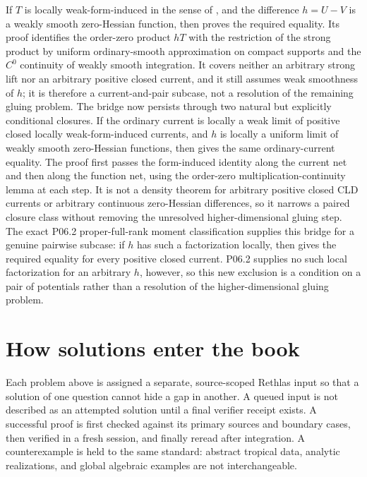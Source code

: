 If \(T\) is locally weak-form-induced in the sense of
, and the difference \(h=U-V\) is a
weakly smooth zero-Hessian function, then
 proves the required equality.  Its
proof identifies the order-zero product \(hT\) with the restriction of the
strong product by uniform ordinary-smooth approximation on compact supports
and the \(C^0\) continuity of weakly smooth integration.  It covers neither an
arbitrary strong lift nor an arbitrary positive closed current, and it still
assumes weak smoothness of \(h\); it is therefore a current-and-pair subcase,
not a resolution of the remaining gluing problem.
The bridge now persists through two natural but explicitly conditional
closures.  If the ordinary current is locally a weak limit of positive closed
locally weak-form-induced currents, and \(h\) is locally a uniform limit of
weakly smooth zero-Hessian functions, then
 gives the same ordinary-current
equality.  The proof first passes the form-induced identity along the current
net and then along the function net, using the order-zero
multiplication-continuity lemma at each step.  It is not a density theorem
for arbitrary positive closed CLD currents or arbitrary continuous
zero-Hessian differences, so it narrows a paired closure class without
removing the unresolved higher-dimensional gluing step.
The exact P06.2
proper-full-rank moment classification supplies this bridge for a genuine
pairwise subcase: if \(h\) has such a factorization locally, then
 gives the required equality
for every positive closed current.  P06.2 supplies no such local
factorization for an arbitrary \(h\), however, so this new exclusion is a
condition on a pair of potentials rather than a resolution of the
higher-dimensional gluing problem.

\section{How solutions enter the book}
\label{sec:ch72-solution-protocol}

Each problem above is assigned a separate, source-scoped Rethlas input so
that a solution of one question cannot hide a gap in another.  A queued input
is not described as an attempted solution until a final verifier receipt
exists.  A successful proof is first checked
against its primary sources and boundary cases, then verified in a fresh
session, and finally reread after integration.  A counterexample is held to
the same standard: abstract tropical data, analytic realizations, and global
algebraic examples are not interchangeable.

